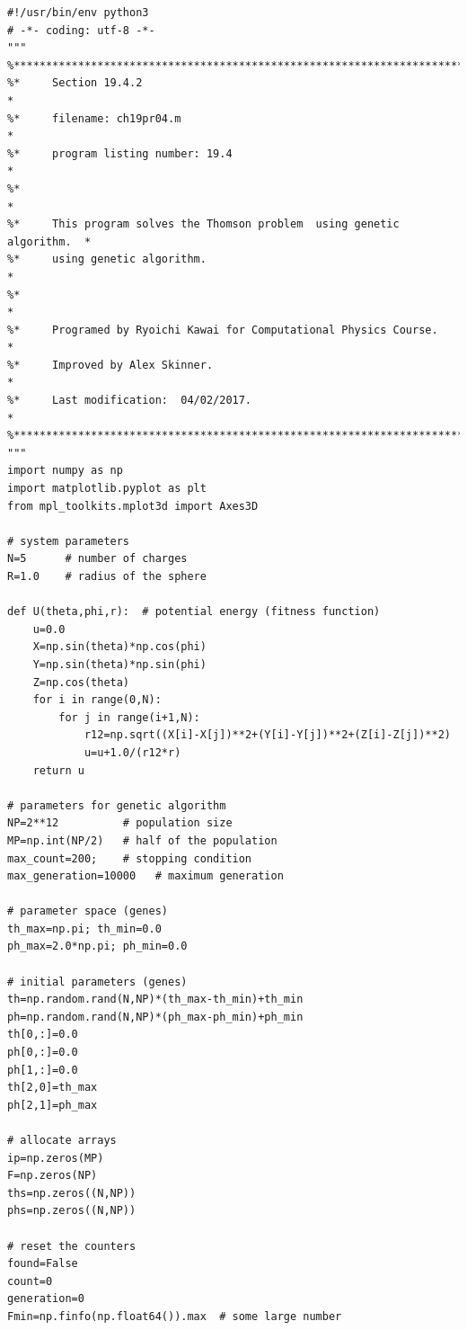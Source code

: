 
\bigskip
\noindent
\program
\footnotesize
\begin{verbatim}
#!/usr/bin/env python3
# -*- coding: utf-8 -*-
"""
%**************************************************************************
%*     Section 19.4.2                                                     *
%*     filename: ch19pr04.m                                               *
%*     program listing number: 19.4                                       *
%*                                                                        *
%*     This program solves the Thomson problem  using genetic algorithm.  *
%*     using genetic algorithm.                                           *
%*                                                                        *
%*     Programed by Ryoichi Kawai for Computational Physics Course.       *
%*     Improved by Alex Skinner.                                          *
%*     Last modification:  04/02/2017.                                    *
%**************************************************************************
"""
import numpy as np
import matplotlib.pyplot as plt
from mpl_toolkits.mplot3d import Axes3D

# system parameters
N=5      # number of charges
R=1.0    # radius of the sphere

def U(theta,phi,r):  # potential energy (fitness function)
    u=0.0
    X=np.sin(theta)*np.cos(phi)
    Y=np.sin(theta)*np.sin(phi)    
    Z=np.cos(theta)    
    for i in range(0,N):
        for j in range(i+1,N):
            r12=np.sqrt((X[i]-X[j])**2+(Y[i]-Y[j])**2+(Z[i]-Z[j])**2)
            u=u+1.0/(r12*r)
    return u
    
# parameters for genetic algorithm
NP=2**12          # population size
MP=np.int(NP/2)   # half of the population
max_count=200;    # stopping condition
max_generation=10000   # maximum generation

# parameter space (genes)
th_max=np.pi; th_min=0.0
ph_max=2.0*np.pi; ph_min=0.0

# initial parameters (genes)
th=np.random.rand(N,NP)*(th_max-th_min)+th_min
ph=np.random.rand(N,NP)*(ph_max-ph_min)+ph_min
th[0,:]=0.0
ph[0,:]=0.0
ph[1,:]=0.0
th[2,0]=th_max
ph[2,1]=ph_max

# allocate arrays
ip=np.zeros(MP)
F=np.zeros(NP)
ths=np.zeros((N,NP))
phs=np.zeros((N,NP))

# reset the counters
found=False
count=0
generation=0
Fmin=np.finfo(np.float64()).max  # some large number 


\end{verbatim}
